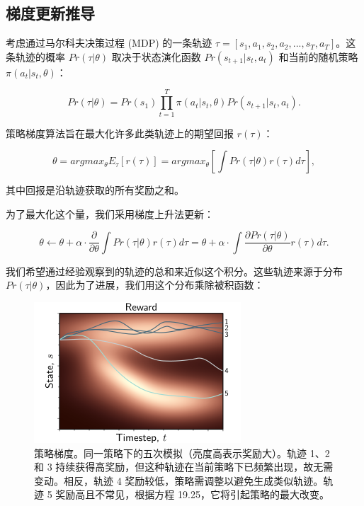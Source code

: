 \subsection{梯度更新推导}
考虑通过马尔科夫决策过程 (MDP) 的一条轨迹 \(\tau = [s_1, a_1, s_2, a_2, ..., s_T, a_T]\)。这条轨迹的概率 \(Pr(\tau|\theta)\) 取决于状态演化函数 \(Pr(s_{t+1}|s_t, a_t)\) 和当前的随机策略 \(\pi(a_t|s_t, \theta)\)：

\begin{equation}
Pr(\tau|\theta) = Pr(s_1) \prod_{t=1}^{T} \pi(a_t|s_t, \theta)Pr(s_{t+1}|s_t, a_t). 
\end{equation}

策略梯度算法旨在最大化许多此类轨迹上的期望回报 \(r(\tau)\)：

\begin{equation}
\theta = argmax_{\theta} E_{\tau} \left[ r(\tau) \right] = argmax_{\theta} \left[ \int Pr(\tau|\theta)r(\tau) d\tau \right], 
\end{equation}

其中回报是沿轨迹获取的所有奖励之和。

为了最大化这个量，我们采用梯度上升法更新：

\begin{equation}
\theta \leftarrow \theta + \alpha \cdot \frac{\partial}{\partial \theta} \int Pr(\tau|\theta)r(\tau) d\tau
= \theta + \alpha \cdot \int \frac{\partial Pr(\tau|\theta)}{\partial \theta} r(\tau) d\tau. 
\end{equation}

我们希望通过经验观察到的轨迹的总和来近似这个积分。这些轨迹来源于分布 \(Pr(\tau|\theta)\)，因此为了进展，我们用这个分布乘除被积函数：

\begin{figure}[ht!]
\centering
\includegraphics[width=0.7\linewidth]{png/chapter19/ReinforcePolicyGrad.png}
\caption{策略梯度。同一策略下的五次模拟（亮度高表示奖励大）。轨迹 1、2 和 3 持续获得高奖励，但这种轨迹在当前策略下已频繁出现，故无需变动。相反，轨迹 4 奖励较低，策略需调整以避免生成类似轨迹。轨迹 5 奖励高且不常见，根据方程 19.25，它将引起策略的最大改变。}
\end{figure}

